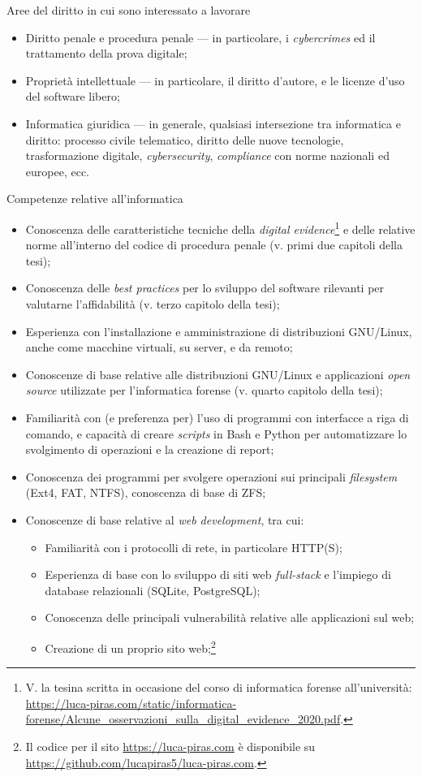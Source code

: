 \documentclass[12pt]{article}
\begin{document}
{\Large Aree del diritto in cui sono interessato a lavorare}

\begin{itemize}
\item Diritto penale e procedura penale --- in particolare, i \textit{cybercrimes} ed il trattamento della prova digitale;
\item Proprietà intellettuale --- in particolare, il diritto d'autore, e le licenze d'uso del software libero;
\item Informatica giuridica --- in generale, qualsiasi intersezione tra informatica e diritto: processo civile telematico, diritto delle nuove tecnologie, trasformazione digitale, \textit{cybersecurity}, \textit{compliance} con norme nazionali ed europee, ecc.
\end{itemize}

{\Large Competenze relative all'informatica}

\begin{itemize}
\item Conoscenza delle caratteristiche tecniche della \textit{digital evidence}\footnote{V. la tesina scritta in occasione del corso di informatica forense all'università: \url{https://luca-piras.com/static/informatica-forense/Alcune_osservazioni_sulla_digital_evidence_2020.pdf}.} e delle relative norme all'interno del codice di procedura penale (v. primi due capitoli della tesi);
\item Conoscenza delle \textit{best practices} per lo sviluppo del software rilevanti per valutarne l'affidabilità (v. terzo capitolo della tesi);
\item Esperienza con l'installazione e amministrazione di distribuzioni GNU/Linux, anche come macchine virtuali, su server, e da remoto;
\item Conoscenze di base relative alle distribuzioni GNU/Linux e applicazioni \textit{open source} utilizzate per l'informatica forense (v. quarto capitolo della tesi);
\item Familiarità con (e preferenza per) l'uso di programmi con interfacce a riga di comando, e capacità di creare \textit{scripts} in Bash e Python per automatizzare lo svolgimento di operazioni e la creazione di report;
\item Conoscenza dei programmi per svolgere operazioni sui principali \textit{filesystem} (Ext4, FAT, NTFS), conoscenza di base di ZFS;
\item Conoscenze di base relative al \textit{web development}, tra cui:
  \begin{itemize}
  \item Familiarità con i protocolli di rete, in particolare HTTP(S);
  \item Esperienza di base con lo sviluppo di siti web \textit{full-stack} e l'impiego di database relazionali (SQLite, PostgreSQL);
  \item Conoscenza delle principali vulnerabilità relative alle applicazioni sul web;
  \item Creazione di un proprio sito web;\footnote{Il codice per il sito \url{https://luca-piras.com} è disponibile su \url{https://github.com/lucapiras5/luca-piras.com}.}
  \end{itemize}
\end{itemize}
\end{document}
